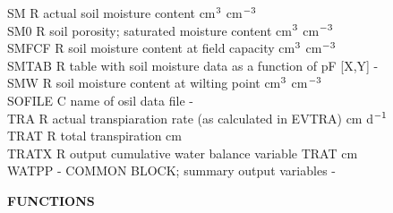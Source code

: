 \documentclass[11pt]{article}
\begin{document}
\begin{tabbing}
SM\> \> R\> actual soil moisture content\> \> \> \> \> \> \> cm$^{{\rm 3}}$ cm$^{{\rm -3}}$\\
SM0\> \> R\> soil porosity; saturated moisture content\> \> \> \> \> \> \> cm$^{{\rm 3}}$ cm$^{{\rm -3}}$\\
SMFCF\> \> R\> soil moisture content at field capacity\> \> \> \> \> \> \> cm$^{{\rm 3}}$ cm$^{{\rm -3}}$\\
SMTAB\> \> R\> table with soil moisture data as a function of pF [X,Y]\> \> \> \> \> \> \> -\\
SMW\> \> R\> soil moisture content at wilting point\> \> \> \> \> \> \> cm$^{{\rm 3}}$ cm$^{{\rm -3}}$\\
SOFILE\> \> C\> name of osil data file\> \> \> \> \> \> \> -\\
TRA\> \> R\> actual transpiaration rate (as calculated in EVTRA)\> \> \> \> \> \> \> cm d$^{{\rm -1}}$\\
TRAT\> \> R\> total transpiration\> \> \> \> \> \> \> cm\\
TRATX\> \> R\> output cumulative water balance variable TRAT\> \> \> \> \> \> \> cm\\
WATPP\> \> -\> COMMON BLOCK; summary output variables\> \> \> \> \> \> \> -
\end{tabbing}
\newpage
{\LARGE {\bf FUNCTIONS}}
\end{document}
